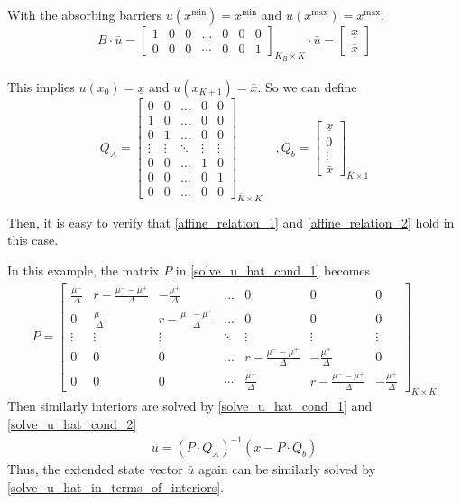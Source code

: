 \documentclass[11pt]{article}
\begin{document}
With the absorbing barriers $u(x^{\min}) = x^{\min}$ and $u(x^{\max}) = x^{\max}$,
\begin{equation}
B\cdot\bar{u} =\begin{bmatrix}
1&0&0&\dots&0&0&0\\
0&0&0&\cdots&0&0&1
\end{bmatrix}_{K_B\times \bar{K}}\cdot\bar{u} = \begin{bmatrix}
\underline{\textit{\~{x}}}\\
\bar{\textit{\~{x}}}
\end{bmatrix}
\end{equation}\\
This implies $u(x_0) = \underline{\textit{\~{x}}}$ and $u(x_{K+1}) = \bar{\textit{\~{x}}}$. So we can define
\begin{equation}
Q_A = \begin{bmatrix}
0& 0&\dots&0&0\\
1&0&\dots&0&0\\
0&1&\dots&0&0\\
\vdots&\vdots&\ddots&\vdots&\vdots\\
0&0&\dots&1&0\\
0&0&\dots&0&1\\
0&0&\dots&0&0
\end{bmatrix}_{\bar{K}\times K}\quad , Q_b = \begin{bmatrix}
\underline{\textit{\~{x}}}\\
0\\
\vdots\\
\bar{\textit{\~{x}}}
\end{bmatrix}_{\bar{K}\times 1}
\end{equation}

Then, it is easy to verify that \eqref{affine_relation_1} and \eqref{affine_relation_2} hold in this case.

In this example, the matrix $P$ in \eqref{solve_u_hat_cond_1} becomes
\begin{align}
P = \begin{bmatrix}
\frac{\mu^-}{\Delta}&r-\frac{\mu^--\mu^+}{\Delta}&-\frac{\mu^+}{\Delta}&\dots&0&0&0\\
0&\frac{\mu^-}{\Delta}&r-\frac{\mu^--\mu^+}{\Delta}&\dots&0&0&0\\
\vdots&\vdots&\vdots&\ddots&\vdots&\vdots&\vdots\\
0&0&0&\dots&r-\frac{\mu^--\mu^+}{\Delta}&-\frac{\mu^+}{\Delta}&0\\
0&0&0&\cdots&\frac{\mu^-}{\Delta}&r-\frac{\mu^--\mu^+}{\Delta}&-\frac{\mu^+}{\Delta}
\end{bmatrix}_{\bar{K}\times\bar{K}}
\end{align}
Then similarly interiors are solved by \eqref{solve_u_hat_cond_1} and \eqref{solve_u_hat_cond_2}
\begin{align}
u = (P\cdot Q_A)^{-1}(x-P\cdot Q_b)
\end{align}
Thus, the extended state vector $\bar{u}$ again can be similarly solved by \eqref{solve_u_hat_in_terms_of_interiors}.
\end{document}
